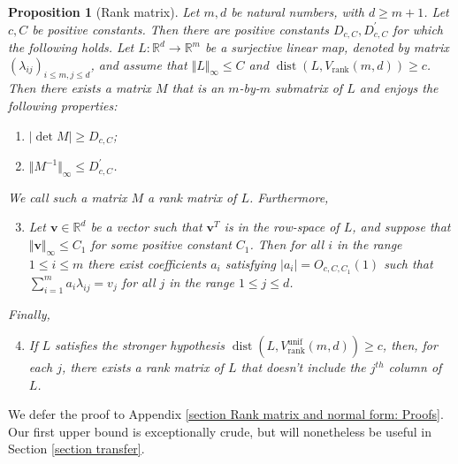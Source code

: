 \documentclass[12pt,a4paper,twoside,reqno]{amsart}
\newtheorem{Proposition}[Theorem]{Proposition}
\newcommand{\rank}{\operatorname{rank}}
\newcommand{\dist}{\operatorname{dist}}
\newcommand{\unif}{\operatorname{unif}}
\numberwithin{equation}{section}
\begin{document}
\begin{Proposition}[Rank matrix]
\label{rank matrix}
Let $m,d$ be natural numbers, with $d\geqslant m+1$. Let $c,C$ be positive constants. Then there are positive constants $D_{c,C}, D^\prime_{c,C}$ for which the following holds. Let $L:\mathbb{R}^d\longrightarrow \mathbb{R}^m$ be a surjective linear map, denoted by matrix $(\lambda_{ij})_{i\leqslant m,j\leqslant d}$, and assume that $\Vert L\Vert_\infty \leqslant C$ and $\dist(L,V_{\rank}(m,d)) \geqslant c$. Then there exists a matrix $M$ that is an $m$-by-$m$ submatrix of $L$ and enjoys the following properties:
\begin{enumerate}[(1)]
\item  $\vert\operatorname{det}M\vert \geqslant D_{c,C}$; \\
\item $\Vert M^{-1}\Vert_{\infty} \leqslant D^\prime_{c,C}$.\\
\end{enumerate}
\noindent We call such a matrix $M$ a \emph{rank matrix} of $L$. Furthermore,\\
\begin{enumerate}[(1)]
\setcounter{enumi}{2}
\item Let $\mathbf{v}\in \mathbb{R}^d$ be a vector such that $\mathbf{v}^T$ is in the row-space of $L$, and suppose that $\Vert \mathbf{v}\Vert_\infty \leqslant C_1$ for some positive constant $C_1$. Then for all $i$ in the range $1\leqslant i\leqslant m$ there exist coefficients $a_i$ satisfying $\vert a_i\vert = O_{c,C,C_1}(1)$ such that $\sum\limits_{i=1}^m a_i \lambda_{ij} = v_{j}$ for all $j$ in the range $1\leqslant j\leqslant d$. \\
\end{enumerate}
Finally,\\
\begin{enumerate}
\setcounter{enumi}{3}
\item If $L$ satisfies the stronger hypothesis $\dist(L,V_{\rank}^{\unif}(m,d))\geqslant c$, then, for each $j$, there exists a rank matrix of $L$ that doesn't include the $j^{th}$ column of $L$.
\end{enumerate}
\end{Proposition}
\noindent We defer the proof to Appendix \ref{section Rank matrix and normal form: Proofs}.\\

Our first upper bound is exceptionally crude, but will nonetheless be useful in Section \ref{section transfer}. 
\end{document}
